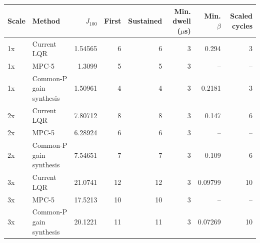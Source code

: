 \begin{tabular}{llrrrrrr}
\toprule
Scale & Method & $J_{100}$ & First & Sustained & Min. dwell ($\mu$s) & Min. $\beta$ & Scaled cycles \\
\midrule
1x & Current LQR & 1.54565 & 6 & 6 & 3 & 0.294 & 3 \\
1x & MPC-5 & 1.3099 & 5 & 5 & 3 & -- & -- \\
1x & Common-P gain synthesis & 1.50961 & 4 & 4 & 3 & 0.2181 & 3 \\
2x & Current LQR & 7.80712 & 8 & 8 & 3 & 0.147 & 6 \\
2x & MPC-5 & 6.28924 & 6 & 6 & 3 & -- & -- \\
2x & Common-P gain synthesis & 7.54651 & 7 & 7 & 3 & 0.109 & 6 \\
3x & Current LQR & 21.0741 & 12 & 12 & 3 & 0.09799 & 10 \\
3x & MPC-5 & 17.5213 & 10 & 10 & 3 & -- & -- \\
3x & Common-P gain synthesis & 20.1221 & 11 & 11 & 3 & 0.07269 & 10 \\
\bottomrule
\end{tabular}
